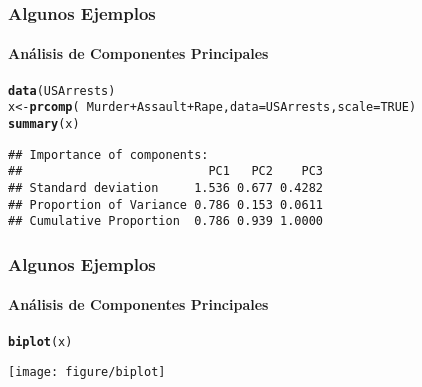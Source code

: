 \documentclass[10pt, letterpaper]{beamer}\usepackage{graphicx, color}
\makeatletter
\newcommand{\hlfunctioncall}[1]{\textcolor[rgb]{0.501960784313725,0,0.329411764705882}{\textbf{#1}}}%
\newenvironment{kframe}{%
 \def\at@end@of@kframe{}%
 \ifinner\ifhmode%
  \def\at@end@of@kframe{\end{minipage}}%
  \begin{minipage}{\columnwidth}%
 \fi\fi%
 \def\FrameCommand##1{\hskip\@totalleftmargin \hskip-\fboxsep
 \colorbox{shadecolor}{##1}\hskip-\fboxsep
     \hskip-\linewidth \hskip-\@totalleftmargin \hskip\columnwidth}%
 \MakeFramed {\advance\hsize-\width
   \@totalleftmargin\z@ \linewidth\hsize
   \@setminipage}}%
 {\par\unskip\endMakeFramed%
 \at@end@of@kframe}
\newenvironment{knitrout}{}{} %
\makeatother
\begin{document}
\begin{frame}[fragile]
\frametitle{Algunos Ejemplos}
\framesubtitle{An\'alisis de Componentes Principales}
\begin{knitrout}\footnotesize
{}\color{fgcolor}\begin{kframe}
\begin{alltt}
\hlfunctioncall{data}(USArrests)
x <- \hlfunctioncall{prcomp}(~Murder + Assault + Rape, data = USArrests, scale = TRUE)
\hlfunctioncall{summary}(x)
\end{alltt}
\begin{verbatim}
## Importance of components:
##                          PC1   PC2    PC3
## Standard deviation     1.536 0.677 0.4282
## Proportion of Variance 0.786 0.153 0.0611
## Cumulative Proportion  0.786 0.939 1.0000
\end{verbatim}
\end{kframe}
\end{knitrout}

\end{frame}

\begin{frame}[fragile]
\frametitle{Algunos Ejemplos}
\framesubtitle{An\'alisis de Componentes Principales}
\begin{knitrout}\footnotesize
{}\color{fgcolor}\begin{kframe}
\begin{alltt}
\hlfunctioncall{biplot}(x)
\end{alltt}
\end{kframe}
\texttt{[image: figure/biplot]} 

\end{knitrout}

\end{frame}
\end{document}
